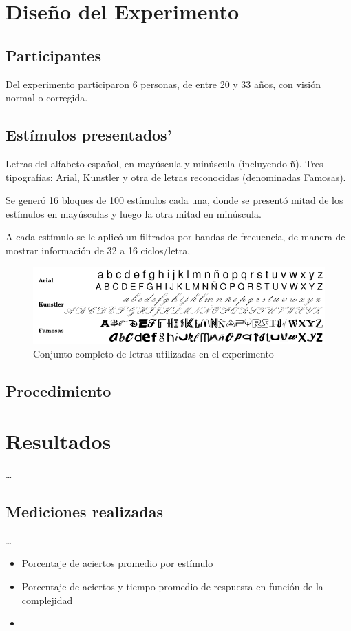 \documentclass[runningheads,a4paper]{llncs}
\begin{document}
\section{Dise\~no del Experimento}
\label{sec:DisenoExperimento}

\subsection{Participantes}

Del experimento participaron 6 personas, de entre 20 y 33 años, con visión normal o corregida.

\subsection{Est\'imulos presentados'}
Letras del alfabeto español, en mayúscula y minúscula (incluyendo ñ).
Tres tipografías: Arial, Kunstler y otra de letras reconocidas (denominadas Famosas).

Se generó 16 bloques de 100 estímulos cada una, donde se presentó mitad de los estímulos en mayúsculas y luego la otra mitad en minúscula.

A cada estímulo se le aplicó un filtrados por bandas de frecuencia, de manera de mostrar información de 32 a 16 ciclos/letra,

\begin{figure}
 \includegraphics[scale=0.23]{letras.png}
  \caption{Conjunto completo de letras utilizadas en el experimento}
  \label{figura:conjuntoLetras}
\end{figure}


\subsection{Procedimiento}


\section{Resultados}
\ldots

\subsection{Mediciones realizadas}
\ldots
\begin{itemize}
 \item Porcentaje de aciertos promedio por estímulo
 \item Porcentaje de aciertos y tiempo promedio de respuesta en función de la complejidad
 \item 

\end{itemize}
\end{document}
